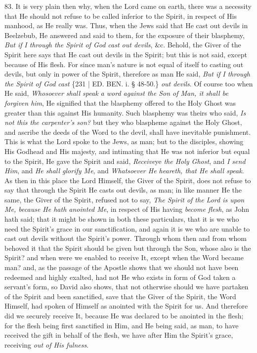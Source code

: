 83. It is very plain then why,
when the Lord came on earth, there was a necessity that He should not
refuse to be called inferior to the Spirit, in respect of His manhood,
as He really was. Thus, when the Jews said that He cast out devils in
Beelzebub, He answered and said to them, for the exposure of their
blasphemy, \emph{But if} \emph{I through the Spirit of God cast out
devils}, \&c. Behold, the Giver of the Spirit here says that He
cast out devils in the Spirit; but this is not said, except because of
His flesh. For since man's nature is not equal of itself to casting
out devils, but only in power of the Spirit, therefore as man He said,
\emph{But if} \emph{I through the Spirit of God cast} \{231 | ED.
BEN.
i. § 48-50.\} \emph{out devils}. Of course too when He said, \emph{Whosoever
shall speak a word against the Son of Man, it shall be forgiven him},
He signified that the blasphemy offered to the Holy Ghost was greater
than this against His humanity. Such blasphemy was theirs who said, \emph{Is
not this the carpenter's son?} but they who blaspheme against the
Holy Ghost, and ascribe the deeds of the Word to the devil, shall have
inevitable punishment. This is what the Lord spoke to the Jews, as
man; but to the disciples, showing His Godhead and His majesty, and
intimating that He was not inferior but equal to the Spirit, He gave
the Spirit and said, \emph{Receive}ye \emph{the Holy Ghost}, and \emph{I
send Him}, and \emph{He shall glorify Me}, and \emph{Whatsoever He
heareth, that He shall speak}. As then in this place the Lord
Himself, the Giver of the Spirit, does not refuse to say that through
the Spirit He casts out devils, as man; in like manner He the same,
the Giver of the Spirit, refused not to say, \emph{The Spirit of the Lord
is upon Me, because He hath anointed Me}, in respect of His having \emph{become
flesh}, as John hath said; that it might be shown in both these
particulars, that it is we who need the Spirit's grace in our
sanctification, and again it is we who are unable to cast out devils
without the Spirit's power. Through whom then and from whom behoved it
that the Spirit should be given but through the Son, whose also is the
Spirit? and when were we enabled to receive It, except when the Word
became man? and, as the passage of the Apostle shows that we should
not have been redeemed and highly exalted, had not He who exists in
form of God taken a servant's form, so David also shows, that not
otherwise should we have partaken of the Spirit and been sanctified,
save that the Giver of the Spirit, the Word Himself, had spoken of
Himself as anointed with the Spirit for us. And therefore did we
securely receive It, because He was declared to be anointed in the
flesh; for the flesh being first sanctified in Him, and He being
said, as man, to have received the gift in behalf of the flesh, we
have after Him the Spirit's grace, receiving \emph{out of His fulness}.

